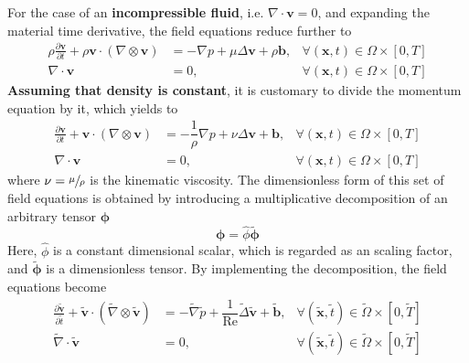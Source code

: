 \documentclass[]{scrartcl}
\newcommand{\pfrac}[2]{\frac{\partial #1}{\partial #2}}
\newcommand{\bs}[1]{\boldsymbol{#1}}
\begin{document}
For the case of an \textbf{incompressible fluid}, i.e. $\nabla \cdot \bs{v} = 0$, and expanding the material time derivative, the field equations reduce further to
\begin{equation*}
	\begin{aligned}
		\rho \pfrac{\bs{v}}{t} +  \rho \bs{v} \cdot (\nabla \otimes \bs{v})&=  -\nabla p + \mu \Delta \bs{v} + \rho \bs{b}, &\forall (\bs{x}, t) \in \Omega \times \left[0, T \right] \\
		\nabla \cdot \bs{v}&= 0, &\forall (\bs{x}, t) \in \Omega \times  \left[0, T \right]
	\end{aligned}
\end{equation*}
\textbf{Assuming that density is constant}, it is customary to divide the momentum equation by it, which yields to 
\begin{subequations}\label{Eqn:ReducedFieldEquations}
	\begin{align}
		\label{Eqn:ReducedNavierStokesLinearMommentum}
		\pfrac{\bs{v}}{t} + \bs{v} \cdot (\nabla \otimes \bs{v})&=  - \dfrac{1}{\rho}\nabla p + \nu \Delta \bs{v} + \bs{b}, &\forall (\bs{x}, t) \in \Omega \times \left[0, T \right] \\
		\label{Eqn:ReducedNavierStokesMassConservation}
		\nabla \cdot \bs{v}&= 0, &\forall (\bs{x}, t) \in \Omega \times  \left[0, T \right]
	\end{align}
\end{subequations}
where $\nu = \sfrac{\mu}{\rho}$ is the kinematic viscosity. The dimensionless form of this set of field equations is obtained by introducing a multiplicative decomposition of an arbitrary tensor $\bs{\phi}$
\begin{equation*}
	\bs{\phi} = \hat{\phi} \tilde{\bs{\phi}}
\end{equation*}
Here, $\hat{\phi}$ is a constant dimensional scalar, which is regarded as an scaling factor, and $ \tilde{\bs{\phi}}$ is a dimensionless tensor. By implementing the decomposition, the field equations become
\begin{subequations}\label{Eqn:AdimensionalReducedFieldEquations}
	\begin{align}
		\label{Eqn:DimensionlessReducedNavierStokesLinearMommentum}
		\pfrac{\bs{\tilde{v}}}{\tilde{t}} + \bs{\tilde{v}} \cdot (\tilde{\nabla} \otimes \bs{\tilde{v}})&=  -\tilde{\nabla} \tilde{p}+ \dfrac{1}{\mathrm{Re}}\tilde{\Delta} \bs{\tilde{v}} + \bs{\tilde{b}}, &\forall (\bs{\tilde{x}}, \tilde{t}) \in \tilde{\Omega} \times [0, \tilde{T} ] \\
		\label{Eqn:DimensionlessReducedNavierStokesMassConservation}
		\tilde{\nabla} \cdot \bs{\tilde{v}}&= 0, &\forall (\bs{\tilde{x}}, \tilde{t}) \in\tilde{ \Omega} \times  [0, \tilde{T} ]
	\end{align}
\end{subequations}
\end{document}
